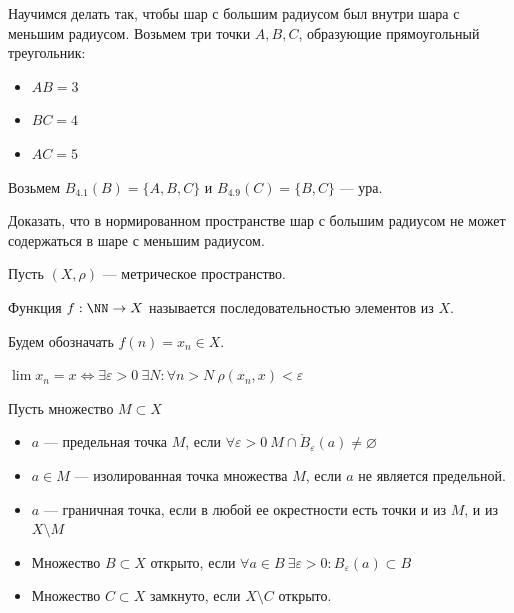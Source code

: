 Научимся делать так, чтобы шар с большим радиусом был внутри шара с меньшим радиусом.
Возьмем три точки \( A, B, C \), образующие прямоугольный треугольник:
\begin{itemize}
    \item
        \( AB = 3 \)
    \item
        \( BC = 4 \)
    \item
        \( AC = 5 \)
\end{itemize}

Возьмем \( B_{4.1}(B) = \{ A, B, C \} \) и \( B_{4.9}(C) = \{ B, C \} \) --- ура.

\begin{exercise}{}{}
    Доказать, что в нормированном пространстве шар с большим радиусом не может содержаться в шаре с меньшим радиусом.
\end{exercise}

\begin{defn}{}{}
    Пусть \( (X, \rho) \) --- метрическое пространство.

    Функция \( f : \NN \to X \) называется последовательностью элементов из \( X \).

    Будем обозначать \( f(n) = x_n \in X \).

    \( \lim x_n = x \Leftrightarrow \exists \varepsilon > 0 \ \exists N : \forall n > N \: \rho(x_n, x) < \varepsilon \)
\end{defn}

\begin{defn}{}{}
    Пусть множество \( M \subset X \)

    \begin{itemize}
        \item
            \( a \) --- предельная точка \( M \), если \( \forall \varepsilon > 0 \ M \cap \mathring{B}_{\varepsilon}(a) \neq \varnothing \)
        \item
            \( a \in M \) --- изолированная точка множества \( M \), если \( a \) не является предельной.
        \item
            \( a \) --- граничная точка, если в любой ее окрестности есть точки и из \( M \), и из \( X \setminus M \)
    \end{itemize}
\end{defn}

\begin{defn}{}{}
    \begin{itemize}
        \item
            Множество \( B \subset X \) открыто, если \( \forall a \in B \ \exists \varepsilon > 0 : B_{\varepsilon} (a) \subset B \)
        \item
            Множество \( C \subset X \) замкнуто, если \( X \setminus C \) открыто.
    \end{itemize}
\end{defn}

